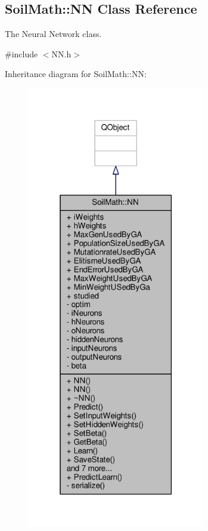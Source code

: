 \hypertarget{class_soil_math_1_1_n_n}{}\subsection{Soil\+Math\+:\+:N\+N Class Reference}
\label{class_soil_math_1_1_n_n}


The Neural Network class.  




{\ttfamily \#include $<$N\+N.\+h$>$}



Inheritance diagram for Soil\+Math\+:\+:N\+N\+:
\nopagebreak
\begin{figure}[H]
\begin{center}
\leavevmode
\includegraphics[height=550pt]{class_soil_math_1_1_n_n__inherit__graph}
\end{center}
\end{figure}


